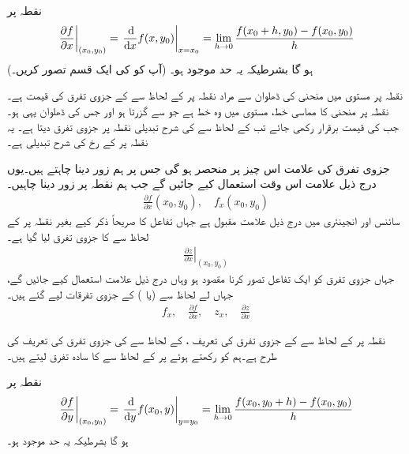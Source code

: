 نقطہ  پر
\begin{align}\label{مساوات_کثیرالمتغیر_جزوی_تفرق_الف}
\left.\frac{\partial f}{\partial x}\right\vert_{(x_0,y_0)}=\left.\frac{\dif}{\dif x}f(x,y_0)\right\vert_{x=x_0}=\lim_{h\to 0}\frac{f(x_0+h,y_0)-f(x_0,y_0)}{h}
\end{align}
ہو گا بشرطیکہ  یہ حد موجود ہو۔ (آپ  کو  کی ایک قسم تصور کریں۔)

نقطہ  پر مستوی  میں منحنی  کی ڈھلوان  سے مراد نقطہ  پر  کے لحاظ سے  کے جزوی تفرق کی قیمت ہے۔  نقطہ  پر منحنی کا مماسی خط، مستوی  میں وہ خط ہے جو  سے گزرتا ہو اور جس کی ڈھلوان یہی ہو۔ جب  کی قیمت برقرار  رکھی جائے  تب  کے لحاظ سے  کی شرح تبدیلی نقطہ  پر جزوی تفرق     دیتا ہے۔ یہ نقطہ  پر  کے رخ  کی شرح تبدیلی  ہے۔

جزوی تفرق کی علامت اس چیز  پر منحصر ہو گی جس پر ہم زور دینا چاہتے ہیں۔یوں درج ذیل علامت اس وقت استعمال کیے جائیں گے  جب ہم نقطہ  پر زور دینا چاہیں۔
\begin{align*}
\frac{\partial f}{\partial x}(x_0,y_0),\quad f_x(x_0,y_0)
\end{align*}
سائنس اور انجینئری میں درج ذیل علامت مقبول ہے جہاں تفاعل کا صریحاً  ذکر  کیے  بغیر نقطہ  پر  کے لحاظ سے   کا  جزوی تفرق لیا  گیا ہے۔
\begin{align*}
\left.\frac{\partial z}{\partial x}\right\vert_{(x_0,y_0)}
\end{align*}
جہاں جزوی تفرق  کو ایک تفاعل تصور کرنا مقصود  ہو وہاں درج ذیل علامت استعمال کیے جائیں گے، جہاں   لے لحاظ سے  (یا ) کے جزوی تفرقات لیے گئے ہیں۔
\begin{align*}
f_x,\quad \frac{\partial f}{\partial x},\quad z_x,\quad \frac{\partial z}{\partial x}
\end{align*}

نقطہ  پر  کے لحاظ سے  کے جزوی تفرق کی تعریف ،  کے لحاظ سے  کی جزوی تفرق کی تعریف کی طرح ہے۔ہم  کو  رکھتے ہوئے  پر  کے لحاظ سے  کا سادہ تفرق لیتے ہیں۔

نقطہ  پر
\begin{align}\label{مساوات_کثیرالمتغیر_جزوی_تفرق_ب}
\left.\frac{\partial f}{\partial y}\right\vert_{(x_0,y_0)}=\left.\frac{\dif}{\dif y}f(x_0,y)\right\vert_{y=y_0}=\lim_{h\to 0}\frac{f(x_0,y_0+h)-f(x_0,y_0)}{h}
\end{align}
ہو گا بشرطیکہ  یہ حد موجود ہو۔ 

